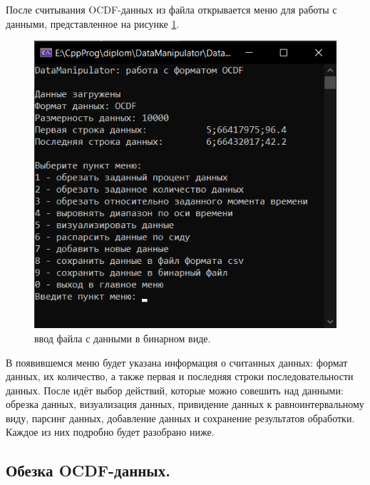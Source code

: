 {\standartFont

  \par После считывания OCDF-данных из файла открывается меню для работы с данными, представленное на рисунке \ref{fig:OCDFmenu}.

  \begin{figure}[H]
    \centering
    \includegraphics{images/forDataManipulator/OCDFmenu.png}
    \caption{ввод файла с данными в бинарном виде.} 
    \label{fig:OCDFmenu}
  \end{figure}

  \par В появившемся меню будет указана информация о считанных данных: формат данных, их количество, а также первая и последняя строки последовательности данных. После идёт выбор действий, которые можно совешить над данными: обрезка данных, визуализация данных, привидение данных к равноинтервальному виду, парсинг данных, добавление данных и сохранение результатов обработки. Каждое из них подробно будет разобрано ниже.

  \par
}

\subsection{ \standartTitleFont
  Обезка OCDF-данных. 
}

